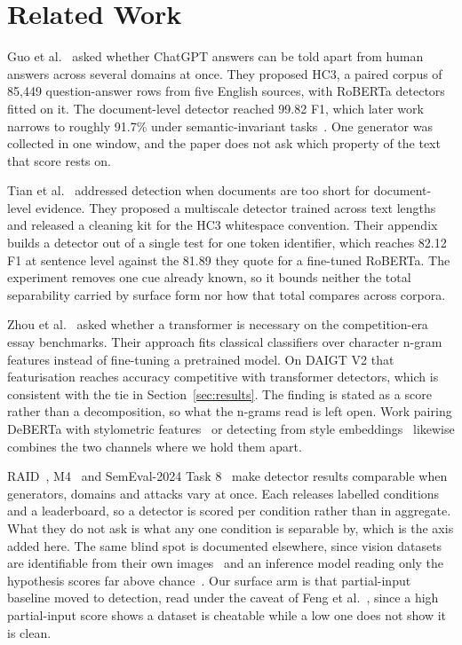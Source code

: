 \section{Related Work}
\label{sec:related}

Guo et al.~\cite{Guo2023close} asked whether ChatGPT answers can be told apart from human answers across several domains at once. They proposed HC3, a paired corpus of 85,449 question-answer rows from five English sources, with RoBERTa detectors fitted on it. The document-level detector reached 99.82 F1, which later work narrows to roughly 91.7\% under semantic-invariant tasks~\cite{Su2023plus}. One generator was collected in one window, and the paper does not ask which property of the text that score rests on.

Tian et al.~\cite{Tian2023multiscale} addressed detection when documents are too short for document-level evidence. They proposed a multiscale detector trained across text lengths and released a cleaning kit for the HC3 whitespace convention. Their appendix builds a detector out of a single test for one token identifier, which reaches 82.12 F1 at sentence level against the 81.89 they quote for a fine-tuned RoBERTa. The experiment removes one cue already known, so it bounds neither the total separability carried by surface form nor how that total compares across corpora.

Zhou et al.~\cite{Zhou2024exploiting} asked whether a transformer is necessary on the competition-era essay benchmarks. Their approach fits classical classifiers over character n-gram features instead of fine-tuning a pretrained model. On DAIGT V2 that featurisation reaches accuracy competitive with transformer detectors, which is consistent with the tie in Section~\ref{sec:results}. The finding is stated as a score rather than a decomposition, so what the n-grams read is left open. Work pairing DeBERTa with stylometric features~\cite{Yadagiri2025aigenerated} or detecting from style embeddings~\cite{Socolof2024style} likewise combines the two channels where we hold them apart.

RAID~\cite{Dugan2024raid}, M4~\cite{Wang2024m4} and SemEval-2024 Task 8~\cite{Wang2024semeval} make detector results comparable when generators, domains and attacks vary at once. Each releases labelled conditions and a leaderboard, so a detector is scored per condition rather than in aggregate. What they do not ask is what any one condition is separable by, which is the axis added here. The same blind spot is documented elsewhere, since vision datasets are identifiable from their own images~\cite{Torralba2011unbiased} and an inference model reading only the hypothesis scores far above chance~\cite{Gururangan2018annotation,Poliak2018hypothesis,Geirhos2020shortcut}. Our surface arm is that partial-input baseline moved to detection, read under the caveat of Feng et al.~\cite{Feng2019misleading}, since a high partial-input score shows a dataset is cheatable while a low one does not show it is clean.


